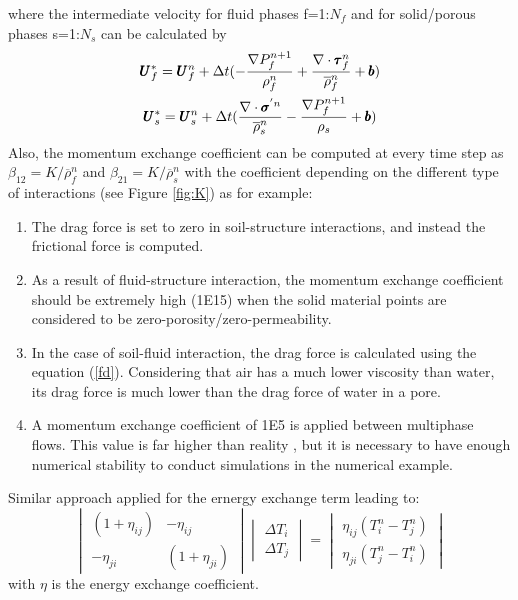 \documentclass[preprint,12pt]{elsarticle}
\begin{document}
%
%
where the intermediate velocity for fluid phases f=1:$N_f$ and for solid/porous phases s=1:$N_s$ can be calculated by
%
\begin{equation}
\begin{gathered}
\pmb{U}_{f}^{*} = \pmb{U}_{f}^{n} + \Delta{t} (-\frac{\nabla P_{f}^{n+1}}{\rho_f^n}  + \frac {\nabla \cdot \pmb{\tau}_f^{n}}{\overline{\rho}^n_{f}} + \pmb{b}) \\
\pmb{U}_{s}^{*} = \pmb{U}_{s}^{n} + \Delta{t} (\frac{\nabla \cdot \pmb{\sigma}^{'n}}{\overline{\rho}^n_{s}}    - \frac{\nabla P_{f}^{n+1}}{\rho_s}  + \pmb{b})
\end {gathered}
\end {equation}
%
%
Also, the momentum exchange coefficient can be computed at every time step as $\beta_{12} = K/\overline{\rho}_{f}^n$ and $\beta_{21} = K/\overline{\rho}_{s}^n$ with the coefficient depending on the different type of interactions (see Figure \ref{fig:K}) as for example: \\
\begin{enumerate}
\item The drag force is set to zero in soil-structure interactions, and instead the frictional force is computed.
\item As a result of fluid-structure interaction, the momentum exchange coefficient should be extremely high (1E15) when the solid material points are considered to be zero-porosity/zero-permeability.
\item In the case of soil-fluid interaction, the drag force is calculated using the equation (\ref{fd}). Considering that air has a much lower viscosity than water, its drag force is much lower than the drag force of water in a pore.
\item A momentum exchange coefficient of 1E5 is applied between multiphase flows. This value is far higher than reality \cite{Stewart1974}, but it is necessary to have enough numerical stability to conduct simulations in the numerical example.
\end {enumerate}
Similar approach applied for the ernergy exchange term leading to:
%
%
\[ \begin{vmatrix} (1 + \eta_{ij})  &  -\eta_{ij} \\
                  -\eta_{ji}       &  (1 + \eta_{ji})
    \end {vmatrix}
    \begin{vmatrix} \Delta T_{i} \\
                    \Delta T_{j}
    \end {vmatrix}
    =
    \begin{vmatrix}  \eta_{ij}(T_{i}^{n} - T_{j}^{n}) \\
                    \eta_{ji}(T_{j}^{n} - T_i^{n})
    \end {vmatrix}                
\]
with $\eta$ is the energy exchange coefficient.\\
\end{document}
